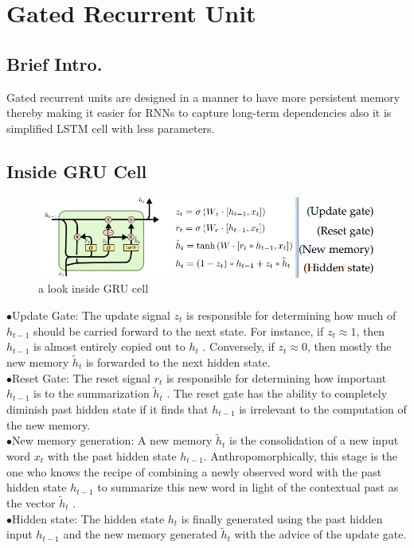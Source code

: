 \section{Gated Recurrent Unit}
\label{chap:Gated Recurrent Unit}

\subsection{Brief Intro.}
Gated recurrent units are designed in a
manner to have more persistent memory thereby making it easier for
RNNs to capture long-term dependencies also it is simplified  LSTM cell with less parameters.
\subsection{Inside GRU Cell}
\begin{figure}[H]%
    \center%
    \includegraphics[width=\textwidth]{images/amir/Capture1.png}%
    \caption[This is gru-inside image]{a look inside GRU cell}\label{fig:gru inside}%
  \end{figure}
\indent$\bullet$Update Gate: The update signal $z_t$
is responsible for determining
how much of $h_{t-1}$ should be carried forward to the next state. For
instance, if $z_{t} \approx 1$, then  $h_{t-1}$ is almost entirely copied out to $h_t$
.
Conversely, if $z_{t} \approx 0$, then mostly the new memory $\tilde{h}_{t}$ 
is forwarded
to the next hidden state.\\
\indent$\bullet$Reset Gate: The reset signal $r_t$
is responsible for determining how
important $h_{t-1}$ is to the summarization $\tilde{h}_{t}$
. The reset gate has the
ability to completely diminish past hidden state if it finds that $h_{t-1}$
is irrelevant to the computation of the new memory.\\
\indent$\bullet$New memory generation: A new memory $\tilde{h}_{t}$
is the consolidation of
a new input word $x_t$ with the past hidden state $h_{t-1}$. Anthropomorphically,
this stage is the one who knows the recipe of combining a
newly observed word with the past hidden state $h_{t-1}$ to summarize
this new word in light of the contextual past as the vector $\tilde{h}_{t}$ .\\
\indent$\bullet$Hidden state: The hidden state $h_t$
is finally generated using the
past hidden input $h_{t-1}$ and the new memory generated $\tilde{h}_{t}$ with the
advice of the update gate.\\
